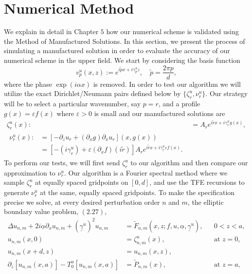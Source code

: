\section{Numerical Method}
\label{intro:numerical results}
We explain in detail in Chapter $5$ how our numerical scheme is validated using the Method of Manufactured Solutions. In this section, we present the process of simulating a manufactured solution in order to evaluate the accuracy of our numerical scheme in the upper field.  We start by considering the basis function
$$v^u_p(x,z):=e^{i\tilde{p}x+i\gamma^u_pz},\quad \tilde{p}=\frac{2\pi p}{d},$$
where the phase $\exp(i \alpha x)$ is removed. In order to test our algorithm we will utilize the exact Dirichlet/Neumann pairs defined below by $\{\zeta^u_r,\nu^u_r\}$. Our strategy will be to select a particular wavenumber, say $p=r$, and a profile $g(x)=\varepsilon f(x)$ where $\varepsilon > 0$ is small and our manufactured solutions are
\begin{subequations}
\begin{align}
\zeta^u_r(x):&= A_r e^{i\tilde{r} x + i\gamma^u_r g(x)},\\
\begin{split}
\nu^u_r(x) :&= [-\partial_z u_r + (\partial_x g)\partial_x u_r](x,g(x))\\&=
[-(i\gamma^u_r)+\varepsilon(\partial_x f)(i\tilde{r})]A_r e^{i\tilde{r} x + i\gamma^u_r \varepsilon f(x)}.
\end{split}
\end{align}
\end{subequations}
To perform our tests, we will first send $\zeta^u_r$ to our algorithm and then compare our approximation to $\nu^u_r$. Our algorithm is a Fourier spectral method \cite{GottliebOrszag77,CHQZ88,DevilleFischerMund02} where we sample $\zeta^u_r$ at equally spaced gridpoints on $[0,d]$, and use the TFE recursions to generate $\nu^u_r$ at the same, equally spaced gridpoints. To make the specification precise we solve, at every desired perturbation order $n$ and $m$, the elliptic boundary value problem, $(2.27)$,
\vspace{-2mm}
\begin{subequations}
\begin{align}
\Delta u_{n,m} +2i\underline{\alpha}\partial_{x}u_{n,m}+(\underline{\gamma}^u)^2u_{n,m}&=\tilde{F}_{n,m}\left(x,z;f,u,\underline{\alpha},\underline{\gamma}^u\right),&&\text{$0<z<a$}, \\
u_{n,m}(x,0)&=\zeta^u_{n,m}(x),&& \text{at $z=0$},\\
u_{n,m}(x+d,z)&=u_{n,m}(x,z), \\
\partial_z \left[u_{n,m}(x,a)\right] - T_0^u[u_{n,m}(x,a)]&=\tilde{P}_{n,m}(x),&& \text{at $z=a$},
\end{align}
\end{subequations}
